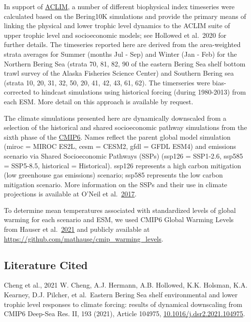 \documentclass[
]{article}
\begin{document}
In support of
\href{www.fisheries.noaa.gov/alaska/ecosystems/alaska-climate-integrated-modeling-project}{ACLIM},
a number of different biophysical index timeseries were calculated based
on the Bering10K simulations and provide the primary means of linking
the physical and lower trophic level dynamics to the ACLIM suite of
upper trophic level and socioeconomic models; see Hollowed et al.~2020
for further details. The timeseries reported here are derived from the
area-weighted strata averages for Summer (months Jul - Sep) and Winter
(Jan - Feb) for the Northern Bering Sea (strata 70, 81, 82, 90 of the
eastern Bering Sea shelf bottom trawl survey of the Alaska Fisheries
Science Center) and Southern Bering sea (strata 10, 20, 31, 32, 50, 20,
41, 42, 43, 61, 62). The timerseries were bias-corrected to hindcast
simulations using historical forcing (during 1980-2013) from each ESM.
More detail on this approach is available by request.

The climate simulations presented here are dynamically downscaled from a
selection of the historical and shared socioeconomic pathway simulations
from the sixth phase of the
\href{https://www.wcrp-climate.org/wgcm-cmip/wgcm-cmip6}{CMIP6}. Names
reflect the parent global model simulation (miroc = MIROC ES2L, cesm =
CESM2, gfdl = GFDL ESM4) and emissions scenario via Shared Socioeconomic
Pathways (SSPs) (ssp126 = SSP1-2.6, ssp585 = SSP5-8.5, historical =
Historical). ssp126 represents a high carbon mitigation (low greenhouse
gas emissions) scenario; ssp585 represents the low carbon mitigation
scenario. More information on the SSPs and their use in climate
projections is available at O'Neil et
al.~\href{https://link.springer.com/article/10.1007/s10584-013-0905-2}{2017}.

To determine mean temperatures associated with standardized levels of
global warming for each scenario and ESM, we used CMIP6 Global Warming
Levels from Hauser et
al.~\href{https://doi.org/10.5281/zenodo.4600706}{2021} and publicly
available at \url{https://github.com/mathause/cmip_warming_levels}.

\hypertarget{literature-cited}{%
\subsection{Literature Cited}\label{literature-cited}}

Cheng et al., 2021 W. Cheng, A.J. Hermann, A.B. Hollowed, K.K. Holsman,
K.A. Kearney, D.J. Pilcher, et al.~Eastern Bering Sea shelf
environmental and lower trophic level responses to climate forcing:
results of dynamical downscaling from CMIP6 Deep-Sea Res. II, 193
(2021), Article 104975,
\href{https://www.sciencedirect.com/science/article/pii/S0967064521000515}{10.1016/j.dsr2.2021.104975}.
\end{document}
